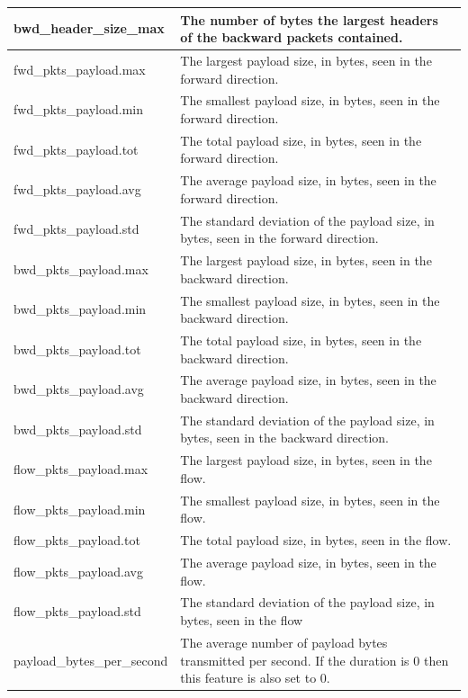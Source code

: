 \documentclass[11pt]{article}
\begin{document}
\begin{table}
\begin{tabular}{|l|p{12cm}|}
    \hline
    bwd\_header\_size\_max & The number of bytes the largest headers of the backward packets contained. \\
    \hline
    fwd\_pkts\_payload.max & The largest payload size, in bytes, seen in the forward direction. \\
    \hline
    fwd\_pkts\_payload.min & The smallest payload size, in bytes, seen in the forward direction. \\
    \hline
    fwd\_pkts\_payload.tot & The total payload size, in bytes, seen in the forward direction. \\
    \hline
    fwd\_pkts\_payload.avg & The average payload size, in bytes, seen in the forward direction. \\
    \hline
    fwd\_pkts\_payload.std & The standard deviation of the payload size, in bytes, seen in the forward direction. \\
    \hline
    bwd\_pkts\_payload.max & The largest payload size, in bytes, seen in the backward direction. \\
    \hline
    bwd\_pkts\_payload.min & The smallest payload size, in bytes, seen in the backward direction. \\
    \hline
    bwd\_pkts\_payload.tot & The total payload size, in bytes, seen in the backward direction. \\
    \hline
    bwd\_pkts\_payload.avg & The average payload size, in bytes, seen in the backward direction. \\
    \hline
    bwd\_pkts\_payload.std & The standard deviation of the payload size, in bytes, seen in the backward direction. \\
    \hline
    flow\_pkts\_payload.max & The largest payload size, in bytes, seen in the flow. \\
    \hline
    flow\_pkts\_payload.min & The smallest payload size, in bytes, seen in the flow. \\
    \hline
    flow\_pkts\_payload.tot & The total payload size, in bytes, seen in the flow. \\
    \hline
    flow\_pkts\_payload.avg & The average payload size, in bytes, seen in the flow. \\
    \hline
    flow\_pkts\_payload.std & The standard deviation of the payload size, in bytes, seen in the flow \\
    \hline
    payload\_bytes\_per\_second & The average number of payload bytes transmitted per second. If the duration is 0 then this feature is also set to 0. \\
    \hline
  \end{tabular}
\end{table}
\end{document}
